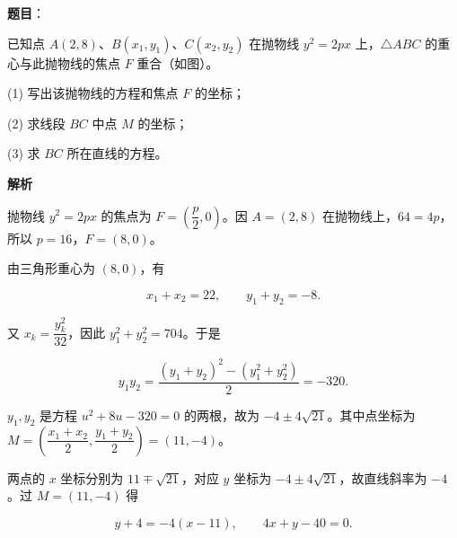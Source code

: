 \begin{answer}

\textbf{题目}：

已知点 $A(2,8)$、$B(x_1,y_1)$、$C(x_2,y_2)$ 在抛物线 $y^2=2px$ 上，$\triangle ABC$ 的重心与此抛物线的焦点 $F$ 重合（如图）。

(1) 写出该抛物线的方程和焦点 $F$ 的坐标；

(2) 求线段 $BC$ 中点 $M$ 的坐标；

(3) 求 $BC$ 所在直线的方程。
\nopagebreak[4]
\begin{center}\end{center}
\nopagebreak[4]
\textbf{解析}


抛物线 $y^2=2px$ 的焦点为 $F=(\dfrac p2,0)$。因 $A=(2,8)$ 在抛物线上，$64=4p$，所以 $p=16$，$F=(8,0)$。


由三角形重心为 $(8,0)$，有

\nopagebreak[4]
\[
x_1+x_2=22,\qquad y_1+y_2=-8.
\]

又 $x_k=\dfrac{y_k^2}{32}$，因此 $y_1^2+y_2^2=704$。于是

\nopagebreak[4]
\[
y_1y_2=\frac{(y_1+y_2)^2-(y_1^2+y_2^2)}2=-320.
\]

$y_1,y_2$ 是方程 $u^2+8u-320=0$ 的两根，故为 $-4\pm4\sqrt{21}$。其中点坐标为 $M=(\dfrac{x_1+x_2}{2},\dfrac{y_1+y_2}{2})=(11,-4)$。


两点的 $x$ 坐标分别为 $11\mp\sqrt{21}$，对应 $y$ 坐标为 $-4\pm4\sqrt{21}$，故直线斜率为 $-4$。过 $M=(11,-4)$ 得

\nopagebreak[4]
\[y+4=-4(x-11),\qquad 4x+y-40=0.\]




\end{answer}
